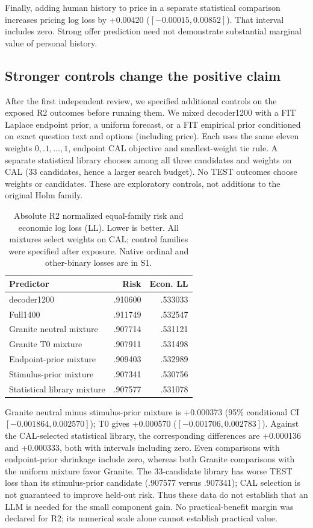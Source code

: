 \documentclass[11pt]{article}
\begin{document}
Finally, adding human history to price in a separate statistical comparison increases pricing log loss by +0.00420 ($[-0.00015,0.00852]$). That interval includes zero. Strong offer prediction need not demonstrate substantial marginal value of personal history.

\subsection{Stronger controls change the positive claim}
After the first independent review, we specified additional controls on the exposed R2 outcomes before running them. We mixed decoder1200 with a FIT Laplace endpoint prior, a uniform forecast, or a FIT empirical prior conditioned on exact question text and options (including price). Each uses the same eleven weights $0,.1,\ldots,1$, endpoint CAL objective and smallest-weight tie rule. A separate statistical library chooses among all three candidates and weights on CAL (33 candidates, hence a larger search budget). No TEST outcomes choose weights or candidates. These are exploratory controls, not additions to the original Holm family.

\begin{table}[t]
\centering\small
\begin{tabular}{lrr}\toprule
Predictor & Risk & Econ. LL\\\midrule
decoder1200 & .910600 & .533033\\
Full1400 & .911749 & .532547\\
Granite neutral mixture & .907714 & .531121\\
Granite T0 mixture & .907911 & .531498\\
Endpoint-prior mixture & .909403 & .532989\\
Stimulus-prior mixture & .907341 & .530756\\
Statistical library mixture & .907577 & .531078\\\bottomrule
\end{tabular}
\caption{Absolute R2 normalized equal-family risk and economic log loss (LL). Lower is better. All mixtures select weights on CAL; control families were specified after exposure. Native ordinal and other-binary losses are in S1.}\label{tab:controls}
\end{table}

Granite neutral minus stimulus-prior mixture is +0.000373 (95\% conditional CI $[-0.001864,0.002570]$); T0 gives +0.000570 ($[-0.001706,0.002783]$). Against the CAL-selected statistical library, the corresponding differences are +0.000136 and +0.000333, both with intervals including zero. Even comparisons with endpoint-prior shrinkage include zero, whereas both Granite comparisons with the uniform mixture favor Granite. The 33-candidate library has worse TEST loss than its stimulus-prior candidate (.907577 versus .907341); CAL selection is not guaranteed to improve held-out risk. Thus these data do not establish that an LLM is needed for the small component gain. No practical-benefit margin was declared for R2; its numerical scale alone cannot establish practical value.
\end{document}
